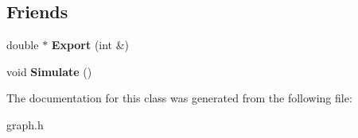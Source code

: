 \subsection*{Friends}
\begin{DoxyCompactItemize}
\item 
\hypertarget{class_base_a50c933a62458087717ab7406e4cf01bc}{double $\ast$ {\bfseries Export} (int \&)}\label{class_base_a50c933a62458087717ab7406e4cf01bc}

\item 
\hypertarget{class_base_a868cf38fedb3c52291069b74bb198bf0}{void {\bfseries Simulate} ()}\label{class_base_a868cf38fedb3c52291069b74bb198bf0}

\end{DoxyCompactItemize}


The documentation for this class was generated from the following file\-:\begin{DoxyCompactItemize}
\item 
graph.\-h\end{DoxyCompactItemize}
